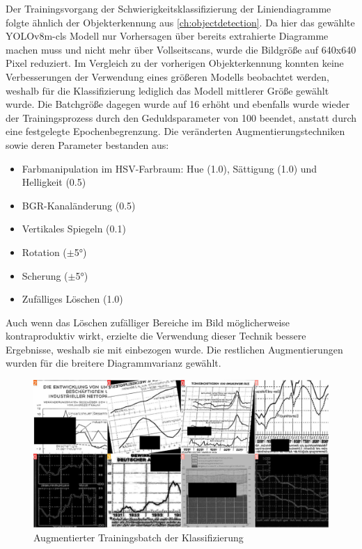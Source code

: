 Der Trainingsvorgang der Schwierigkeitsklassifizierung der Liniendiagramme folgte ähnlich der Objekterkennung aus \ref{ch:objectdetection}. Da hier das gewählte YOLOv8m-cls Modell nur Vorhersagen über bereits extrahierte Diagramme machen muss und nicht mehr über Vollseitscans, wurde die Bildgröße auf 640x640 Pixel reduziert. Im Vergleich zu der vorherigen Objekterkennung konnten keine Verbesserungen der Verwendung eines größeren Modells beobachtet werden, weshalb für die Klassifizierung lediglich das Modell mittlerer Größe gewählt wurde. Die Batchgröße dagegen wurde auf 16 erhöht und ebenfalls wurde wieder der Trainingsprozess durch den Geduldsparameter von 100 beendet, anstatt durch eine festgelegte Epochenbegrenzung. Die veränderten Augmentierungstechniken sowie deren Parameter bestanden aus:

\begin{itemize}[itemsep=0pt, topsep=0pt]
    \item Farbmanipulation im HSV-Farbraum: Hue (1.0), Sättigung (1.0) und Helligkeit (0.5)
    \item BGR-Kanaländerung (0.5)
    \item Vertikales Spiegeln (0.1)
    \item Rotation ($\pm$5°)
    \item Scherung ($\pm$5°)
    \item Zufälliges Löschen (1.0)
\end{itemize}

Auch wenn das Löschen zufälliger Bereiche im Bild möglicherweise kontraproduktiv wirkt, erzielte die Verwendung dieser Technik bessere Ergebnisse, weshalb sie mit einbezogen wurde. Die restlichen Augmentierungen wurden für die breitere Diagrammvarianz gewählt.

\begin{figure}[H]
    \centering
    \captionsetup{width=.75\linewidth}
    \includegraphics[width=.75\textwidth]{Implementation/img/classify_train_batch.jpg}
    \caption{ Augmentierter Trainingsbatch der Klassifizierung}
    \label{fig:classify_train_batch}
\end{figure}

